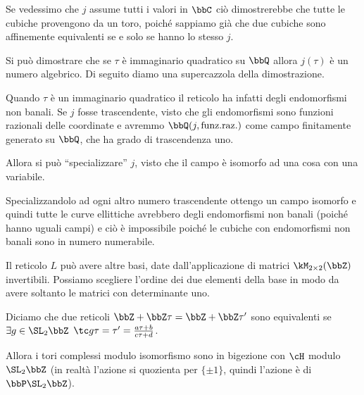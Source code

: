 \begin{osservazione} \label{170123-j_suriettiva}
  Se vedessimo che $j$ assume tutti i valori in $\bbC$ ciò dimostrerebbe
  che tutte le cubiche provengono da un toro, poiché sappiamo già che
  due cubiche sono affinemente equivalenti se e solo se hanno lo stesso $j$.
\end{osservazione}

\begin{divagazione}
  Si può dimostrare che se $\tau$ è immaginario quadratico su $\bbQ$ allora
  $j(\tau)$ è un numero algebrico. Di seguito diamo una supercazzola della dimostrazione.

  Quando $\tau$ è un immaginario quadratico il reticolo ha infatti degli
  endomorfismi non banali. Se $j$ fosse trascendente, visto che gli
  endomorfismi sono funzioni razionali delle coordinate e avremmo
  $\bbQ(j, \text{funz.raz.})$ come campo finitamente generato su $\bbQ$,
  che ha grado di trascendenza uno.

  Allora si può ``specializzare'' $j$, visto che il campo è isomorfo ad
  una cosa con una variabile.

  
  Specializzandolo ad ogni altro numero trascendente ottengo un campo
  isomorfo e quindi tutte le curve ellittiche avrebbero degli
  endomorfismi non banali (poiché hanno uguali campi) e ciò è
  impossibile poiché le cubiche con endomorfismi non banali sono in numero
  numerabile.
\end{divagazione}

Il reticolo $L$ può avere altre basi, date dall'applicazione di matrici
$\kM_{2 \times 2} (\bbZ)$ invertibili. Possiamo scegliere l'ordine dei
due elementi della base in modo da avere soltanto le matrici con
determinante uno.

Diciamo che due reticoli $\bbZ + \bbZ \tau = \bbZ + \bbZ \tau'$ sono
equivalenti se $\exists g \in \SL_2 \bbZ$
$\tc g\tau = \tau' = \frac{a \tau + b}{c \tau + d}$.

Allora i tori complessi modulo isomorfismo sono in bigezione con $\cH$
modulo $\SL_2 \bbZ$ (in realtà l'azione si quozienta per $\{\pm 1\}$,
quindi l'azione è di $\bbP\SL_2 \bbZ$).

